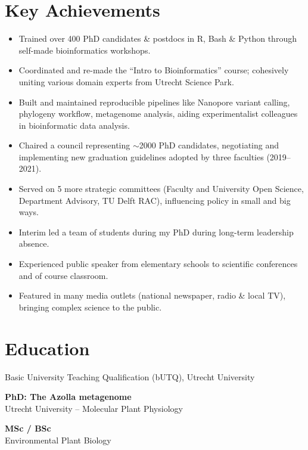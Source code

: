 \documentclass[a4paper,10pt]{article}
\begin{document}
{\begin{adjustbox}{valign=t}
\begin{minipage}[t]{0.6\textwidth}
\section*{Key Achievements}
\begin{itemize}
    \setlength{\itemindent}{0em}
    \setlength{\parindent}{5em}
  \item Trained over 400 PhD candidates \& postdocs in R, Bash \& Python through self-made bioinformatics workshops.
  \item Coordinated and re-made the “Intro to Bioinformatics” course; cohesively uniting various domain experts from Utrecht Science Park.
  \item Built and maintained reproducible pipelines like Nanopore variant calling, phylogeny workflow, metagenome analysis, aiding experimentalist colleagues in bioinformatic data analysis.
  \item Chaired a council representing $\sim$2000 PhD candidates, negotiating and implementing new graduation guidelines adopted by three faculties (2019--2021).
  \item Served on 5 more strategic committees (Faculty and University Open Science, Department Advisory, TU Delft RAC), influencing policy in small and big ways.
  \item Interim led a team of students during my PhD during long-term leadership absence.
  \item Experienced public speaker from elementary schools to scientific conferences and of course classroom.
  \item Featured in many media outlets (national newspaper, radio \& local TV), bringing complex science to the public.
\end{itemize}


\end{minipage}%
\end{adjustbox}%
}
\newpage

\section*{Education}
\begin{description}
\raggedright
\item[\normalfont \textcolor{ForestGreen}{\textbf{2022.}}] Basic University Teaching Qualification (bUTQ), Utrecht University
\item[\normalfont \textcolor{ForestGreen}{\textbf{2017 -- 2022.}}] \textbf{PhD: The Azolla metagenome} \\
Utrecht University – Molecular Plant Physiology
\item[\normalfont \textcolor{ForestGreen}{\textbf{2010 -- 2017.}}] \textbf{MSc / BSc}\\
Environmental Plant Biology
\end{description}
\end{document}

